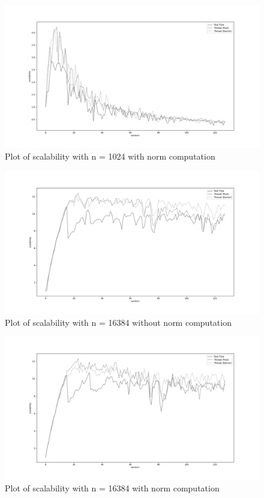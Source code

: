 \documentclass[12pt]{extarticle}
\begin{document}
\begin{figure}[H]
\centering
    \includegraphics[width=18cm, center]{./plots/scalability_1024_1.png}
    \caption{Plot of scalability with n = 1024 with norm computation}
\end{figure} 

\begin{figure}[H]
\centering
    \includegraphics[width=18cm, center]{./plots/scalability_16384_0.png}
    \caption{Plot of scalability with n = 16384 without norm computation}
\end{figure} 


\begin{figure}[H]
\centering
    \includegraphics[width=18cm, center]{./plots/scalability_16384_1.png}
    \caption{Plot of scalability with n = 16384 with norm computation}
\end{figure} 
\end{document}
